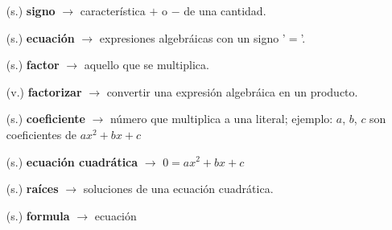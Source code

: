 \begin{tcolorbox}[
        enhanced,
        colback=orange!5!white,
        colframe=orange!35!white,
        coltitle=black,
        fonttitle=\bfseries,
        center title,
        title=Vocabulario]
    \begin{itemize}[leftmargin=*]
        \item[(s.)] \textbf{signo} $\rightarrow$ característica $+$ o $-$ de una cantidad.
        \item[(s.)] \textbf{ecuación} $\rightarrow$ expresiones algebráicas con un signo '$=$'.
        \item[(s.)] \textbf{factor} $\rightarrow$ aquello que se multiplica.
        \item[(v.)] \textbf{factorizar} $\rightarrow$ convertir una expresión algebráica en un producto.
        \item[(s.)] \textbf{coeficiente} $\rightarrow$ número que multiplica a una literal; ejemplo: $a$, $b$, $c$ son coeficientes de $ax^2+bx+c$
        \item[(s.)] \textbf{ecuación cuadrática} $\rightarrow$ $0 = ax^2+bx+c$
        \item[(s.)] \textbf{raíces} $\rightarrow$ soluciones de una ecuación cuadrática.
        \item[(s.)] \textbf{formula} $\rightarrow$ ecuación
    \end{itemize}
\end{tcolorbox}
